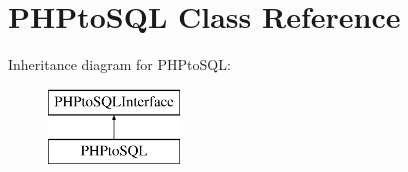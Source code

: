 \hypertarget{class_p_h_pto_s_q_l}{}\section{P\+H\+Pto\+S\+QL Class Reference}
\label{class_p_h_pto_s_q_l}
Inheritance diagram for P\+H\+Pto\+S\+QL\+:\begin{figure}[H]
\begin{center}
\leavevmode
\includegraphics[height=2.000000cm]{class_p_h_pto_s_q_l}
\end{center}
\end{figure}
